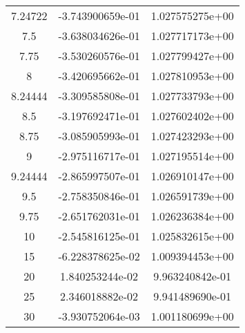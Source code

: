 {\begin{tabular}{|*{3}{c}|}
7.24722 & -3.743900659e-01 & 1.027575275e+00\\
7.5 & -3.638034626e-01 & 1.027717173e+00\\
7.75 & -3.530260576e-01 & 1.027799427e+00\\
8 & -3.420695662e-01 & 1.027810953e+00\\
8.24444 & -3.309585808e-01 & 1.027733793e+00\\
8.5 & -3.197692471e-01 & 1.027602402e+00\\
8.75 & -3.085905993e-01 & 1.027423293e+00\\
9 & -2.975116717e-01 & 1.027195514e+00\\
9.24444 & -2.865997507e-01 & 1.026910147e+00\\
9.5 & -2.758350846e-01 & 1.026591739e+00\\
9.75 & -2.651762031e-01 & 1.026236384e+00\\
10 & -2.545816125e-01 & 1.025832615e+00\\
15 & -6.228378625e-02 & 1.009394453e+00\\
20 & 1.840253244e-02 & 9.963240842e-01\\
25 & 2.346018882e-02 & 9.941489690e-01\\
30 & -3.930752064e-03 & 1.001180699e+00\\\hline
\end{tabular}
}
